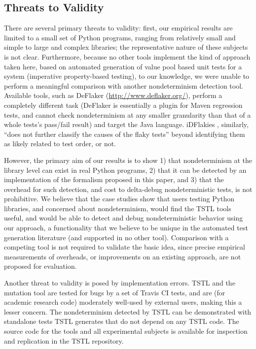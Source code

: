 \subsection{Threats to Validity}

There are several primary threats to validity:  first, our empirical
results are limited to a small set of Python programs, ranging from
relatively small and simple to large and complex libraries; the
representative nature of these subjects is not clear.
Furthermore, because
no other tools implement the kind of approach taken here, based on
automated generation of value pool based unit tests for a system
(imperative property-based testing), to our knowledge, we were unable
to perform a meaningful comparison with another nondeterminism
detection tool.  Available tools, such as DeFlaker \cite{bell2018d}
(\url{http://www.deflaker.org/}), perform a completely different task (DeFlaker
is essentially a plugin for Maven regression tests, and cannot check
nondeterminism at any smaller granularity than that of a whole tests's
pass/fail result) and target the Java language.  iDFlakies
\cite{idflakies}, similarly, ``does not further classify the causes of
the flaky tests'' beyond identifying them as likely related to test
order, or not.

However, the primary
aim of our results is to show 1) that nondeterminism at the library
level can exist in real Python programs, 2) that it can be detected
by an implementation of the formalism proposed in this paper, and 3)
that the overhead for such detection, and cost to delta-debug
nondeterministic tests, is not prohibitive.  We believe that the case
studies show that users testing Python libraries, and concerned about
nondeterminism, would find the TSTL tools useful, and would be able to
detect and debug nondeterministic behavior using our approach, a
functionality that we believe to be unique in the automated test generation
literature (and supported in no other tool).  Comparison with a
competing tool is not required to validate the basic idea, since
precise empirical measurements of overheads, or improvements on an
existing approach, are not proposed for evaluation.

Another threat to validity is posed by implementation errors.
TSTL and the mutation tool are tested for bugs by a set of Travis CI
tests, and are (for academic research code) moderately well-used by
external users, making this a lesser concern.  The nondeterminism
detected by TSTL can be demonstrated with standalone tests TSTL
generates that do not depend on any TSTL code.
The source code for the tools and all experimental subjects is
available for inspection and replication in the TSTL repository.